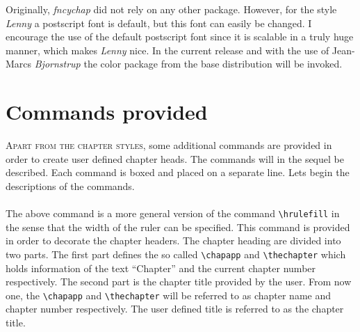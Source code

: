 \documentclass{report}
\newcommand{\sk}{\vspace{0.2 cm}}
\newcommand{\A}[1]{{\texttt{\textbackslash #1}}}
\newcommand{\nsp}{\mbox{\hspace{-1 cm}}}
\begin{document}
    Originally, \textsl{fncychap} did not rely on any other package.
    However, for the style {\em Lenny} a postscript font is default, but
    this font can easily be changed. I encourage the use of the default
    postscript font since it is scalable in a truly huge manner, which
    makes {\em Lenny} nice. In the current release and with the use of
    Jean-Marcs \textsl{Bjornstrup} the color package from the base
    distribution will be invoked.
    
  \chapter{Commands provided}
  \lettrine{A}{part from the chapter styles}, some additional commands are
  provided in order to create user defined chapter heads. The commands
  will in the sequel be described. Each command is boxed and placed on
  a separate line. Lets begin the descriptions of the commands.\sk\\ 
  \nsp\fbox{\A{mghrulefill}\texttt{\textbraceleft}{\em
  width}\texttt{\textbraceright}}\sk\\
  The above command is a more general version of the command
  \A{hrulefill} in the sense that the width of the ruler can be
  specified. This command is provided in order to decorate the chapter
  headers. The chapter heading are divided into two parts. The first
  part defines the so called \A{chapapp} and \A{thechapter} which
  holds information of the text ``Chapter'' and the current chapter number
  respectively. The second part is the chapter title provided by the
  user. From now one, the \A{chapapp} and \A{thechapter} will be
  referred to as chapter name and chapter number respectively. The
  user defined title is referred to as the chapter title.
\end{document}

